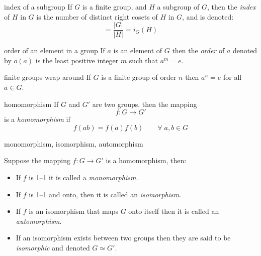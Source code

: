 \documentclass[avery5371,grid]{flashcards}
\begin{document}
\begin{flashcard}[Definition]{index of a subgroup}
If $G$ is a finite group, and $H$ a subgroup of $G$, then the
\textit{index} of $H$ in $G$ is the number of distinct right cosets
of $H$ in $G$, and is denoted:
\begin{equation*}
[G : H] = \dfrac{|G|}{|H|} = i_{G}(H)
\end{equation*}
\end{flashcard}

\begin{flashcard}[Definition]{order of an element in a group}
If $a$ is an element of $G$ then the \textit{order} of $a$ denoted by $o(a)$ is the least positive integer $m$ such that $a^m = e$.
\end{flashcard}

\begin{flashcard}[Theorem]{finite groups wrap around}
If $G$ is a finite group of order $n$ then $a^n = e$ for all $a \in G$.
\end{flashcard}

\begin{flashcard}[Definition]{homomorphism}
If $G$ and $G'$ are two groups, then the mapping
\begin{equation*}
f: G\rightarrow G'
\end{equation*}
is a \textit{homomorphism} if 
\begin{equation*}
f(ab) = f(a)f(b) \qquad \forall \; a,b \in G
\end{equation*}
\end{flashcard}

\begin{flashcard}[Definition]{monomorphism, isomorphism, automorphism}
\begin{small}
Suppose the mapping $f: G\rightarrow G'$ is a homomorphism, then:
\begin{itemize}
\item If $f$ is 1--1 it is called a \textit{monomorphism}.
\item If $f$ is 1--1 and onto, then it is called an \mbox{\textit{isomorphism}}.
\item If $f$ is an isomorphism that maps $G$ onto itself then it is called
an \textit{automorphism}.
\item If an isomorphism exists between two groups then they are said to be
\textit{isomorphic} and denoted $G\simeq G'$.
\end{itemize}
\end{small}
\end{flashcard}
\end{document}

